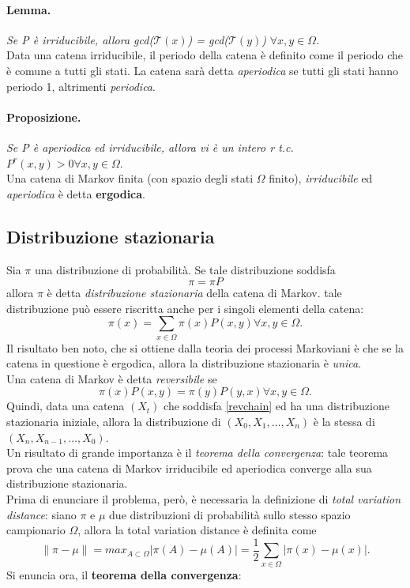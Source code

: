 \paragraph{Lemma.} \textit{Se P è irriducibile, allora gcd($\mathcal{T}(x)$) = gcd($\mathcal{T}(y)$)} $\forall x, y \in \Omega$.\\
Data una catena irriducibile, il periodo della catena è definito come il periodo che è comune a tutti gli stati. La catena sarà detta \textit{aperiodica} se tutti gli stati hanno periodo 1, altrimenti \textit{periodica}.
\paragraph{Proposizione.} \textit{Se P è aperiodica ed irriducibile, allora vi è un intero r t.c.} $P^r(x, y) > 0 \forall x, y \in \Omega$.\\
Una catena di Markov finita (con spazio degli stati $\Omega$ finito), \textit{irriducibile} ed \textit{aperiodica} è detta \textbf{ergodica}.
\subsection{Distribuzione stazionaria}
Sia $\pi$ una distribuzione di probabilità. Se tale distribuzione soddisfa
\begin{equation}
	\pi = \pi P
\end{equation}
allora $\pi$ è detta \textit{distribuzione stazionaria} della catena di Markov. tale distribuzione può essere riscritta anche per i singoli elementi della catena:
\begin{equation}
	\pi(x) = \sum_{x\in \Omega}{\pi(x)P(x, y)} \forall x,y \in \Omega.
\end{equation}
Il risultato ben noto, che si ottiene dalla teoria dei processi Markoviani è che se la catena in questione è ergodica, allora la distribuzione stazionaria è \textit{unica}.\\
Una catena di Markov è detta \textit{reversibile} se
\begin{equation}
	\pi(x)P(x,y) = \pi(y)P(y,x) \forall x,y \in \Omega.
	\label{revchain}
\end{equation}
Quindi, data una catena $(X_t)$ che soddisfa \ref{revchain} ed ha una distribuzione stazionaria iniziale, allora la distribuzione di $(X_0, X_1, \dots, X_n)$ è la stessa di $(X_n, X_{n-1}, \dots, X_0)$.\\
Un risultato di grande importanza è il \textit{teorema della convergenza}: tale teorema prova che una catena di Markov irriducibile ed aperiodica converge alla sua distribuzione stazionaria.\\
Prima di enunciare il problema, però, è necessaria la definizione di \textit{total variation distance}: siano $\pi$ e $\mu$ due distribuzioni di probabilità sullo stesso spazio campionario $\Omega$, allora la total variation distance è definita come
\begin{equation}
	\|\pi - \mu\| = max_{A\subset\Omega}|\pi(A) - \mu(A)| = \frac{1}{2}\sum_{x\in\Omega}{|\pi(x) - \mu(x)|}.
\end{equation}
Si enuncia ora, il \textbf{teorema della convergenza}:
